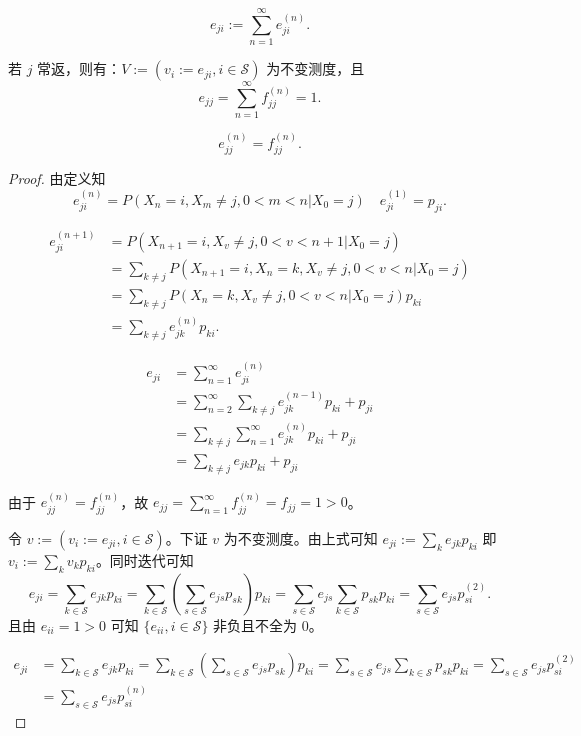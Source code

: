 \documentclass[lang=cn,10pt,thmcnt=section]{elegantbook}
\begin{document}
	\[
	e_{ji} := \sum_{n=1}^{\infty} e_{ji}^{(n)}.
	\]
\begin{theorem}
	若 $j$ 常返，则有：$V := (v_i := e_{ji}, i \in \mathcal{S})$ 为不变测度，且
\[
e_{jj} = \sum_{n=1}^{\infty} f_{jj}^{(n)} = 1.
\]
\end{theorem}
\begin{remark}
	\[
e_{jj}^{(n)} = f_{jj}^{(n)}.
\]
\end{remark}
\begin{proof}
	由定义知
	\[
	e_{ji}^{(n)} = P(X_n = i, X_m \neq j, 0 < m < n | X_0 = j) \quad e_{ji}^{(1)} = p_{ji}. \tag{5.3}
	\]
		
		\begin{align*}
		e_{ji}^{(n+1)} &= P(X_{n+1} = i, X_v \neq j, 0 < v < n + 1 | X_0 = j) \\
		&= \sum_{k \neq j} P(X_{n+1} = i, X_n = k, X_v \neq j, 0 < v < n | X_0 = j) \\
		&= \sum_{k \neq j} P(X_n = k, X_v \neq j, 0 < v < n | X_0 = j) p_{ki} \\
		&= \sum_{k \neq j} e_{jk}^{(n)} p_{ki}.
		\end{align*}
		
		\begin{align*}
		e_{ji} &= \sum_{n=1}^{\infty} e_{ji}^{(n)} \\
		&= \sum_{n=2}^{\infty} \sum_{k \neq j} e_{jk}^{(n-1)} p_{ki} + p_{ji} \\
		&= \sum_{k \neq j} \sum_{n=1}^{\infty} e_{jk}^{(n)} p_{ki} + p_{ji} \\
		&= \sum_{k \neq j} e_{jk} p_{ki} + p_{ji}
		\end{align*}
		
		由于 $e_{jj}^{(n)} = f_{jj}^{(n)}$，故 $e_{jj} = \sum_{n=1}^{\infty} f_{jj}^{(n)} = f_{jj} = 1 > 0$。
		
		令 $v := (v_i := e_{ji}, i \in \mathcal{S})$。下证 $v$ 为不变测度。由上式可知 $e_{ji} := \sum_k e_{jk} p_{ki}$ 即 $v_i := \sum_k v_k p_{ki}$。同时迭代可知
		\[
		e_{ji} = \sum_{k \in \mathcal{S}} e_{jk} p_{ki} = \sum_{k \in \mathcal{S}} \left( \sum_{s \in \mathcal{S}} e_{js} p_{sk} \right) p_{ki} = \sum_{s \in \mathcal{S}} e_{js} \sum_{k \in \mathcal{S}} p_{sk} p_{ki} = \sum_{s \in \mathcal{S}} e_{js} p_{si}^{(2)}.
		\]
		且由 $e_{ii} = 1 > 0$ 可知 $\{e_{ii}, i \in \mathcal{S}\}$ 非负且不全为 0。
		
		\begin{align*}
		e_{ji} &= \sum_{k \in \mathcal{S}} e_{jk} p_{ki} = \sum_{k \in \mathcal{S}} \left( \sum_{s \in \mathcal{S}} e_{js} p_{sk} \right) p_{ki} = \sum_{s \in \mathcal{S}} e_{js} \sum_{k \in \mathcal{S}} p_{sk} p_{ki} = \sum_{s \in \mathcal{S}} e_{js} p_{si}^{(2)} \\
		&= \sum_{s \in \mathcal{S}} e_{js} p_{si}^{(n)}
		\end{align*}
		

\end{proof}
\end{document}
